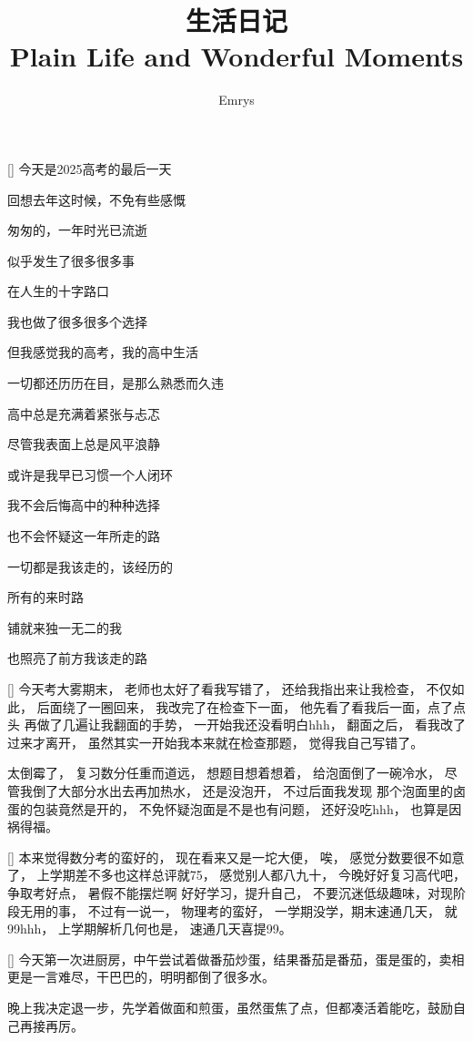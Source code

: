 \documentclass{diary}
\title{生活日记 \\{\small Plain Life and Wonderful Moments}}
\author{Emrys}
\begin{document}
\maketitle

\Address[江苏][南京]
[\sun]%
今天是2025高考的最后一天

回想去年这时候，不免有些感慨

匆匆的，一年时光已流逝

似乎发生了很多很多事

在人生的十字路口

我也做了很多很多个选择

但我感觉我的高考，我的高中生活

一切都还历历在目，是那么熟悉而久违

高中总是充满着紧张与忐忑

尽管我表面上总是风平浪静

或许是我早已习惯一个人闭环

我不会后悔高中的种种选择

也不会怀疑这一年所走的路

一切都是我该走的，该经历的

所有的来时路

铺就来独一无二的我

也照亮了前方我该走的路


[\winkSmile]%
今天考大雾期末，
老师也太好了看我写错了，
还给我指出来让我检查，
不仅如此，
后面绕了一圈回来，
我改完了在检查下一面，
他先看了看我后一面，点了点头
再做了几遍让我翻面的手势，
一开始我还没看明白hhh，
翻面之后，
看我改了过来才离开，
虽然其实一开始我本来就在检查那题，
觉得我自己写错了。\par
太倒霉了，
复习数分任重而道远，
想题目想着想着，
给泡面倒了一碗冷水，
尽管我倒了大部分水出去再加热水，
还是没泡开，
不过后面我发现
那个泡面里的卤蛋的包装竟然是开的，
不免怀疑泡面是不是也有问题，
还好没吃hhh，
也算是因祸得福。

[\confused]%
本来觉得数分考的蛮好的，
现在看来又是一坨大便，
唉，
感觉分数要很不如意了，
上学期差不多也这样总评就75，
感觉别人都八九十，
今晚好好复习高代吧，争取考好点，
暑假不能摆烂啊
好好学习，提升自己，
不要沉迷低级趣味，对现阶段无用的事，
不过有一说一，
物理考的蛮好，
一学期没学，期末速通几天，
就99hhh，
上学期解析几何也是，
速通几天喜提99。

[\nerdSmile]%
今天第一次进厨房，中午尝试着做番茄炒蛋，结果番茄是番茄，蛋是蛋的，卖相更是一言难尽，干巴巴的，明明都倒了很多水。\par
晚上我决定退一步，先学着做面和煎蛋，虽然蛋焦了点，但都凑活着能吃，鼓励自己再接再厉。\\
\end{document}
